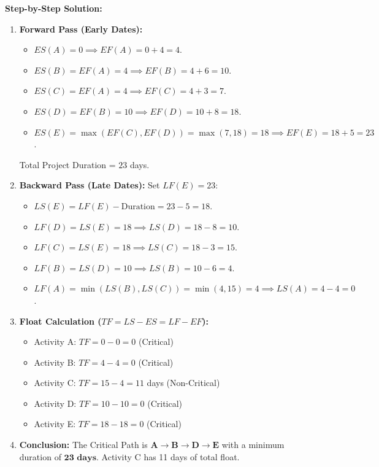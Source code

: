 \textbf{Step-by-Step Solution:}
\begin{enumerate}[label=\arabic*.]
    \item \textbf{Forward Pass (Early Dates):}
    \begin{itemize}
        \item $ES(A) = 0 \implies EF(A) = 0 + 4 = 4$.
        \item $ES(B) = EF(A) = 4 \implies EF(B) = 4 + 6 = 10$.
        \item $ES(C) = EF(A) = 4 \implies EF(C) = 4 + 3 = 7$.
        \item $ES(D) = EF(B) = 10 \implies EF(D) = 10 + 8 = 18$.
        \item $ES(E) = \max(EF(C), EF(D)) = \max(7, 18) = 18 \implies EF(E) = 18 + 5 = 23$.
    \end{itemize}
    Total Project Duration = $23$ days.

    \item \textbf{Backward Pass (Late Dates):}
    Set $LF(E) = 23$:
    \begin{itemize}
        \item $LS(E) = LF(E) - \text{Duration} = 23 - 5 = 18$.
        \item $LF(D) = LS(E) = 18 \implies LS(D) = 18 - 8 = 10$.
        \item $LF(C) = LS(E) = 18 \implies LS(C) = 18 - 3 = 15$.
        \item $LF(B) = LS(D) = 10 \implies LS(B) = 10 - 6 = 4$.
        \item $LF(A) = \min(LS(B), LS(C)) = \min(4, 15) = 4 \implies LS(A) = 4 - 4 = 0$.
    \end{itemize}

    \item \textbf{Float Calculation ($TF = LS - ES = LF - EF$):}
    \begin{itemize}
        \item Activity A: $TF = 0 - 0 = 0$ (Critical)
        \item Activity B: $TF = 4 - 4 = 0$ (Critical)
        \item Activity C: $TF = 15 - 4 = 11$ days (Non-Critical)
        \item Activity D: $TF = 10 - 10 = 0$ (Critical)
        \item Activity E: $TF = 18 - 18 = 0$ (Critical)
    \end{itemize}
    \item \textbf{Conclusion:} The Critical Path is $\mathbf{A \rightarrow B \rightarrow D \rightarrow E}$ with a minimum duration of $\mathbf{23\text{ days}}$. Activity C has 11 days of total float.
\end{enumerate}

